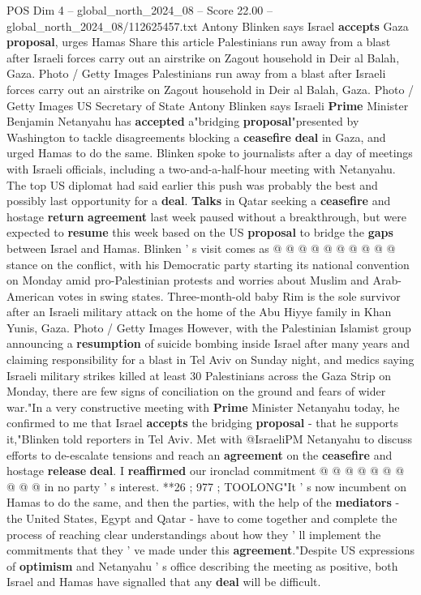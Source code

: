 \begin{textsample}{POS Dim 4 – global\_north\_2024\_08 – Score 22.00 – global\_north\_2024\_08/112625457.txt}  \label{ex:f4_pos_169}
Antony Blinken says Israel \textbf{accepts} Gaza \textbf{proposal}, urges Hamas Share this article Palestinians run away from a blast after Israeli forces carry out an airstrike on Zagout household in Deir al Balah, Gaza.
Photo / Getty Images Palestinians run away from a blast after Israeli forces carry out an airstrike on Zagout household in Deir al Balah, Gaza.
Photo / Getty Images US Secretary of State Antony Blinken says Israeli \textbf{Prime} Minister Benjamin Netanyahu has \textbf{accepted} a"bridging \textbf{proposal}"presented by Washington to tackle disagreements blocking a \textbf{ceasefire} \textbf{deal} in Gaza, and urged Hamas to do the same.
Blinken spoke to journalists after a day of meetings with Israeli officials, including a two-and-a-half-hour meeting with Netanyahu.
The top US diplomat had said earlier this push was probably the best and possibly last opportunity for a \textbf{deal}. \textbf{Talks} in Qatar seeking a \textbf{ceasefire} and hostage \textbf{return} \textbf{agreement} last week paused without a breakthrough, but were expected to \textbf{resume} this week based on the US \textbf{proposal} to bridge the \textbf{gaps} between Israel and Hamas.
Blinken ' s visit comes as @ @ @ @ @ @ @ @ @ @ stance on the conflict, with his Democratic party starting its national convention on Monday amid pro-Palestinian protests and worries about Muslim and Arab-American votes in swing states.
Three-month-old baby Rim is the sole survivor after an Israeli military attack on the home of the Abu Hiyye family in Khan Yunis, Gaza.
Photo / Getty Images However, with the Palestinian Islamist group announcing a \textbf{resumption} of suicide bombing inside Israel after many years and claiming responsibility for a blast in Tel Aviv on Sunday night, and medics saying Israeli military strikes killed at least 30 Palestinians across the Gaza Strip on Monday, there are few signs of conciliation on the ground and fears of wider war."In a very constructive meeting with \textbf{Prime} Minister Netanyahu today, he confirmed to me that Israel \textbf{accepts} the bridging \textbf{proposal} - that he supports it,"Blinken told reporters in Tel Aviv.
Met with @IsraeliPM Netanyahu to discuss efforts to de-escalate tensions and reach an \textbf{agreement} on the \textbf{ceasefire} and hostage \textbf{release} \textbf{deal}.
I \textbf{reaffirmed} our ironclad commitment @ @ @ @ @ @ @ @ @ @ in no party ' s interest. **26 ; 977 ; TOOLONG"It ' s now incumbent on Hamas to do the same, and then the parties, with the help of the \textbf{mediators} - the United States, Egypt and Qatar - have to come together and complete the process of reaching clear understandings about how they ' ll implement the commitments that they ' ve made under this \textbf{agreement}."Despite US expressions of \textbf{optimism} and Netanyahu ' s office describing the meeting as positive, both Israel and Hamas have signalled that any \textbf{deal} will be difficult.

\end{textsample}

